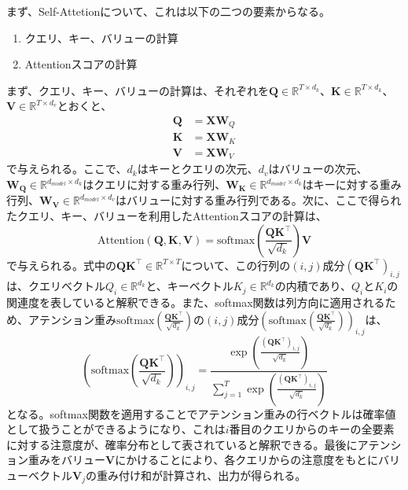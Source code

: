 \documentclass[12pt]{jarticle}
\numberwithin{equation}{section}    %
\numberwithin{figure}{section}      %
\numberwithin{table}{section}      %
\begin{document}
まず、Self-Attetionについて、これは以下の二つの要素からなる。
\begin{enumerate}
    \item クエリ、キー、バリューの計算
    \item Attentionスコアの計算
\end{enumerate}
まず、クエリ、キー、バリューの計算は、それぞれを$\bm{Q} \in \mathbb{R}^{T \times d_{k}}$、$\bm{K} \in \mathbb{R}^{T \times d_{k}}$、$\bm{V} \in \mathbb{R}^{T \times d_{v}}$とおくと、
\begin{align}
    \bm{Q} & = \bm{X}\bm{W}_{Q} \\
    \bm{K} & = \bm{X}\bm{W}_{K} \\
    \bm{V} & = \bm{X}\bm{W}_{V}
\end{align}
で与えられる。ここで、$d_{k}$はキーとクエリの次元、$d_{v}$はバリューの次元、$\bm{W_{Q}} \in \mathbb{R}^{d_{model} \times d_{k}}$はクエリに対する重み行列、$\bm{W_{K}} \in \mathbb{R}^{d_{model} \times d_{k}}$はキーに対する重み行列、$\bm{W_{V}} \in \mathbb{R}^{d_{model} \times d_{v}}$はバリューに対する重み行列である。次に、ここで得られたクエリ、キー、バリューを利用したAttentionスコアの計算は、
\begin{equation}
    \text{Attention}(\bm{Q}, \bm{K}, \bm{V}) = \text{softmax}\left(\frac{\bm{Q}\bm{K}^\top}{\sqrt{d_{k}}}\right) \bm{V}
\end{equation}
で与えられる。式中の$\bm{Q}\bm{K}^\top \in \mathbb{R}^{T \times T}$について、この行列の$(i, j)$成分$(\bm{Q}\bm{K}^\top)_{i, j}$は、クエリベクトル$Q_{i} \in \mathbb{R}^{d_{k}}$と、キーベクトル$K_{j} \in \mathbb{R}^{d_{k}}$の内積であり、$Q_{i}$と$K_{i}$の関連度を表していると解釈できる。また、softmax関数は列方向に適用されるため、アテンション重み$\text{softmax}\left(\frac{\bm{Q}\bm{K}^\top}{\sqrt{d_{k}}}\right)$の$(i, j)$成分$\left(\text{softmax}\left(\frac{\bm{Q}\bm{K}^\top}{\sqrt{d_{k}}}\right)\right)_{i, j}$は、
\begin{equation}
    \left(\text{softmax}\left(\frac{\bm{Q}\bm{K}^\top}{\sqrt{d_{k}}}\right)\right)_{i, j} = \frac{\exp\left(\frac{(\bm{Q}\bm{K}^\top)_{i, j}}{\sqrt{d_{k}}}\right)}{\sum_{j = 1}^{T} \exp\left(\frac{(\bm{Q}\bm{K}^\top)_{i, j}}{\sqrt{d_{k}}}\right)}
\end{equation}
となる。softmax関数を適用することでアテンション重みの行ベクトルは確率値として扱うことができるようになり、これは$i$番目のクエリからのキーの全要素に対する注意度が、確率分布として表されていると解釈できる。最後にアテンション重みをバリュー$\bm{V}$にかけることにより、各クエリからの注意度をもとにバリューベクトル$\bm{V}_{j}$の重み付け和が計算され、出力が得られる。
\end{document}
